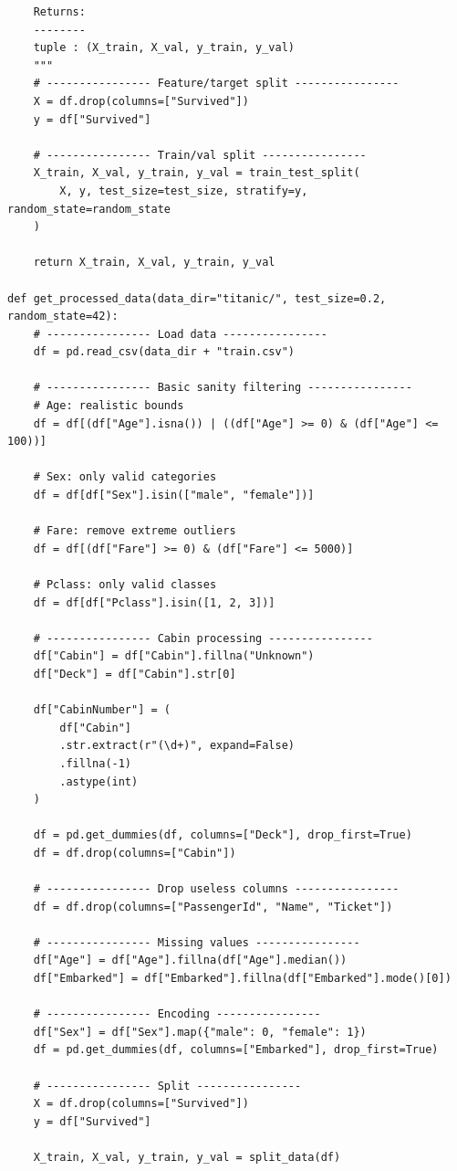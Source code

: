 \documentclass[14pt,a4paper]{extarticle}
\begin{document}
\begin{verbatim}
    Returns:
    --------
    tuple : (X_train, X_val, y_train, y_val)
    """
    # ---------------- Feature/target split ----------------
    X = df.drop(columns=["Survived"])
    y = df["Survived"]

    # ---------------- Train/val split ----------------
    X_train, X_val, y_train, y_val = train_test_split(
        X, y, test_size=test_size, stratify=y, random_state=random_state
    )

    return X_train, X_val, y_train, y_val

def get_processed_data(data_dir="titanic/", test_size=0.2, random_state=42):
    # ---------------- Load data ----------------
    df = pd.read_csv(data_dir + "train.csv")

    # ---------------- Basic sanity filtering ----------------
    # Age: realistic bounds
    df = df[(df["Age"].isna()) | ((df["Age"] >= 0) & (df["Age"] <= 100))]

    # Sex: only valid categories
    df = df[df["Sex"].isin(["male", "female"])]

    # Fare: remove extreme outliers
    df = df[(df["Fare"] >= 0) & (df["Fare"] <= 5000)]

    # Pclass: only valid classes
    df = df[df["Pclass"].isin([1, 2, 3])]

    # ---------------- Cabin processing ----------------
    df["Cabin"] = df["Cabin"].fillna("Unknown")
    df["Deck"] = df["Cabin"].str[0]

    df["CabinNumber"] = (
        df["Cabin"]
        .str.extract(r"(\d+)", expand=False)
        .fillna(-1)
        .astype(int)
    )

    df = pd.get_dummies(df, columns=["Deck"], drop_first=True)
    df = df.drop(columns=["Cabin"])

    # ---------------- Drop useless columns ----------------
    df = df.drop(columns=["PassengerId", "Name", "Ticket"])

    # ---------------- Missing values ----------------
    df["Age"] = df["Age"].fillna(df["Age"].median())
    df["Embarked"] = df["Embarked"].fillna(df["Embarked"].mode()[0])

    # ---------------- Encoding ----------------
    df["Sex"] = df["Sex"].map({"male": 0, "female": 1})
    df = pd.get_dummies(df, columns=["Embarked"], drop_first=True)

    # ---------------- Split ----------------
    X = df.drop(columns=["Survived"])
    y = df["Survived"]

    X_train, X_val, y_train, y_val = split_data(df)


\end{verbatim}
\end{document}
